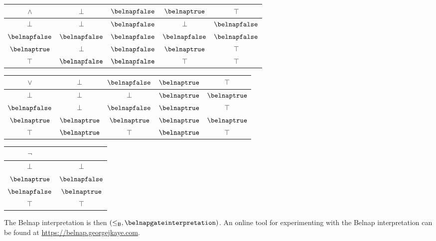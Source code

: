 \begin{example}
    \begin{center}
        \begin{tabular}{|c|cccc|}
            \hline
            \(\land\)        & \(\bot\)         & \(\belnapfalse\) & \(\belnaptrue\)  & \(\top\)         \\
            \hline
            \(\bot\)         & \(\bot\)         & \(\belnapfalse\) & \(\bot\)         & \(\belnapfalse\) \\
            \(\belnapfalse\) & \(\belnapfalse\) & \(\belnapfalse\) & \(\belnapfalse\) & \(\belnapfalse\) \\
            \(\belnaptrue\)  & \(\bot\)         & \(\belnapfalse\) & \(\belnaptrue\)  & \(\top\)         \\
            \(\top\)         & \(\belnapfalse\) & \(\belnapfalse\) & \(\top\)         & \(\top\)         \\
            \hline
        \end{tabular}
        \quad
        \begin{tabular}{|c|cccc|}
            \hline
            \(\lor\)         & \(\bot\)        & \(\belnapfalse\) & \(\belnaptrue\) & \(\top\)        \\
            \hline
            \(\bot\)         & \(\bot\)        & \(\bot\)         & \(\belnaptrue\) & \(\belnaptrue\) \\
            \(\belnapfalse\) & \(\bot\)        & \(\belnapfalse\) & \(\belnaptrue\) & \(\top\)        \\
            \(\belnaptrue\)  & \(\belnaptrue\) & \(\belnaptrue\)  & \(\belnaptrue\) & \(\belnaptrue\) \\
            \(\top\)         & \(\belnaptrue\) & \(\top\)         & \(\belnaptrue\) & \(\top\)        \\
            \hline
        \end{tabular}
        \quad
        \begin{tabular}{|c|c|}
            \hline
            \(\neg\)         &                  \\
            \hline
            \(\bot\)         & \(\bot\)         \\
            \(\belnaptrue\)  & \(\belnapfalse\) \\
            \(\belnapfalse\) & \(\belnaptrue\)  \\
            \(\top\)         & \(\top\)         \\
            \hline
        \end{tabular}
    \end{center}

    The Belnap interpretation is then \(
    (\leq_\mathsf{B}, \belnapgateinterpretation)
    \).
    An online tool for experimenting with the Belnap interpretation can be found
    at \url{https://belnap.georgejkaye.com}.
\end{example}
